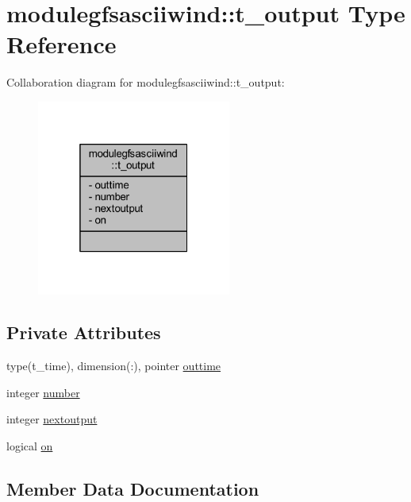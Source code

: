 \hypertarget{structmodulegfsasciiwind_1_1t__output}{}\section{modulegfsasciiwind\+:\+:t\+\_\+output Type Reference}
\label{structmodulegfsasciiwind_1_1t__output}


Collaboration diagram for modulegfsasciiwind\+:\+:t\+\_\+output\+:\nopagebreak
\begin{figure}[H]
\begin{center}
\leavevmode
\includegraphics[width=181pt]{structmodulegfsasciiwind_1_1t__output__coll__graph}
\end{center}
\end{figure}
\subsection*{Private Attributes}
\begin{DoxyCompactItemize}
\item 
type(t\+\_\+time), dimension(\+:), pointer \mbox{\hyperlink{structmodulegfsasciiwind_1_1t__output_a221434e2319c28e7211b2294387c51a2}{outtime}}
\item 
integer \mbox{\hyperlink{structmodulegfsasciiwind_1_1t__output_a31ba90dc2e2028c845c9e98228b1d49b}{number}}
\item 
integer \mbox{\hyperlink{structmodulegfsasciiwind_1_1t__output_afd8e9f362e365df77b7e6aa5cc37104f}{nextoutput}}
\item 
logical \mbox{\hyperlink{structmodulegfsasciiwind_1_1t__output_a5f7d9140d987dd4fec5a33e859f0706f}{on}}
\end{DoxyCompactItemize}


\subsection{Member Data Documentation}
\mbox{\label{structmodulegfsasciiwind_1_1t__output_afd8e9f362e365df77b7e6aa5cc37104f}} 
